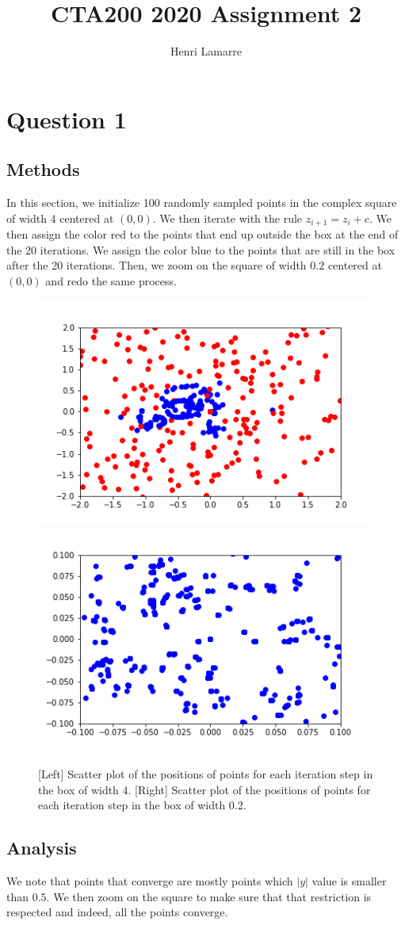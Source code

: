 \documentclass{article}
\title{CTA200 2020 Assignment 2}
\author{Henri Lamarre}
\date{}
\begin{document}
\maketitle

\section{Question 1}
\subsection{Methods}
In this section, we initialize 100 randomly sampled points in the complex square of width 4 centered at $(0,0)$. We then iterate with the rule $z_{i+1}=z_i+c$. We then assign the color red to the points that end up outside the box at the end of the 20 iterations. We assign the color blue to the points that are still in the box after the 20 iterations. Then, we zoom on the square of width $0.2$ centered at $(0,0)$ and redo the same process.

\begin{figure}[h]
\includegraphics[width = 0.5\columnwidth]{question1_1.png}
\includegraphics[width = 0.5\columnwidth]{question1_2.png}
\caption{[Left] Scatter plot of the positions of points for each iteration step in the box of width 4. [Right] Scatter plot of the positions of points for each iteration step in the box of width 0.2.}
\end{figure}


\subsection{Analysis}
We note that points that converge are mostly points which $|y|$ value is smaller than $0.5$. We then zoom on the square to make sure that that restriction is respected and indeed, all the points converge.
\end{document}
